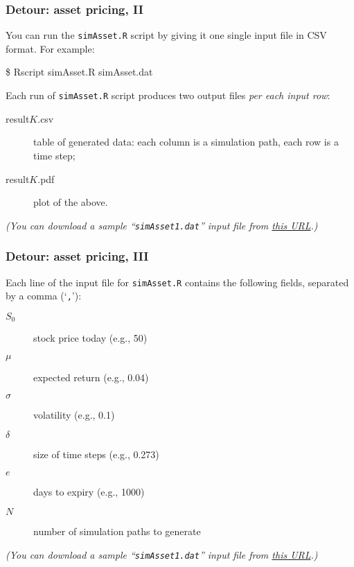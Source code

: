 \documentclass[english,serif,mathserif,xcolor=pdftex,dvipsnames,table]{beamer}
\begin{document}
\begin{frame}[fragile]
  \frametitle{Detour: asset pricing, II}
  \small You can run the \texttt{simAsset.R} script by giving it one single
  input file in CSV format.  For example:
\begin{semiverbatim}
  \$ Rscript simAsset.R simAsset.dat
\end{semiverbatim}

  \+ Each run of \texttt{simAsset.R} script produces two output files \emph{per
    each input row}:
  \begin{description}
  \item[result$K$.csv] table of generated data: each column is a simulation path, each row is a time step;
  \item[result$K$.pdf] plot of the above.
  \end{description}

  \+ \footnotesize
  {\em (You can download a sample ``\texttt{simAsset1.dat}'' input file from
    \href{https://raw.githubusercontent.com/riccardomurri/python-for-science-intro/master/download/}{this
      URL}.)}
\end{frame}


\begin{frame}[fragile]
  \frametitle{Detour: asset pricing, III}

  Each line of the input file for \texttt{simAsset.R} contains the following
  fields, separated by a comma (`\texttt{,}'):
  \begin{description}
  \item[$S_0$] stock price today (e.g., 50)
  \item[$\mu$] expected return (e.g., 0.04)
  \item[$\sigma$] volatility (e.g., 0.1)
  \item[$\delta$] size of time steps (e.g., 0.273)
  \item[$e$] days to expiry (e.g., 1000)
  \item[$N$] number of simulation paths to generate
  \end{description}

  \+ \footnotesize
  {\em (You can download a sample ``\texttt{simAsset1.dat}'' input file from
    \href{https://raw.githubusercontent.com/riccardomurri/python-for-science-intro/master/download/}{this
      URL}.)}
\end{frame}
\end{document}
